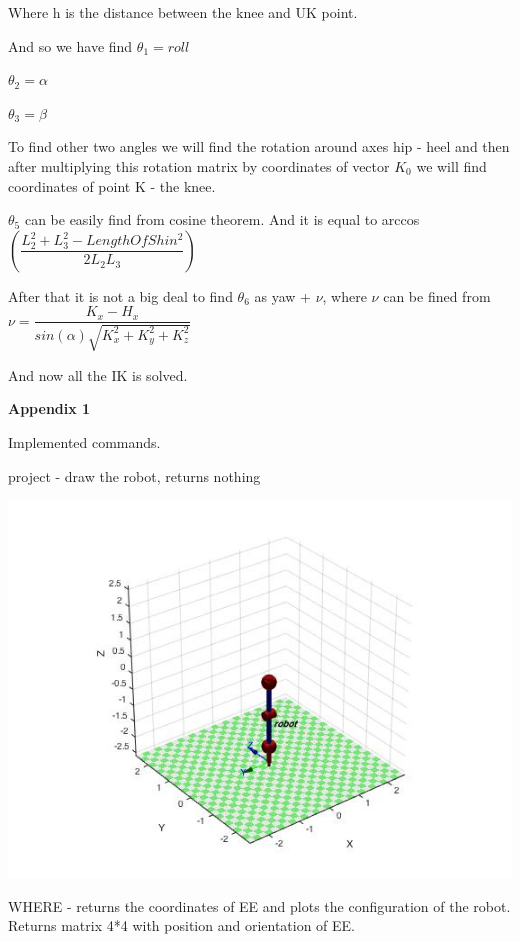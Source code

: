 \documentclass[12pt]{article}
\begin{document}
Where h is the distance between the knee and UK point.

And so we have find
$\theta_1 = roll$

$\theta_2 = \alpha$

$\theta_3 = \beta$

To find other two angles we will find the rotation around axes hip - heel and then after multiplying this rotation matrix by coordinates of vector $K_0$ we will find coordinates of point K - the knee. 

$\theta_5$ can be easily find from cosine theorem. And it is equal to arccos $\left(  \dfrac{L^2_2 + L^2_3 - LengthOfShin^2}{2 L_2 L_3} \right)$

After that it is not a big deal to find $\theta_6$ as yaw + $\nu$, where $\nu$ can be fined from $\nu = \dfrac{K_x - H_x}{sin(\alpha) \sqrt{K^2_x + K^2_y + K^2_z}}$

And now all the IK is solved.

\newpage

\begin{center}
\textbf{Appendix 1}
\end{center}

Implemented commands.

project - draw the robot, returns nothing

\begin{center}
  \includegraphics[width=15cm]{conf}
\end{center}

WHERE - returns the coordinates of EE and plots the configuration of the robot. Returns matrix 4*4 with position and orientation of EE.
\end{document}
